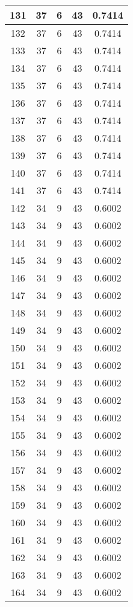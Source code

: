 \documentclass[letterpaper, 12pt]{article}
\begin{document}
\begin{longtable}{|c|c|c|c|c|}
\hline
131 & 37 & 6 & 43 & 0.7414 \\
\hline
132 & 37 & 6 & 43 & 0.7414 \\
\hline
133 & 37 & 6 & 43 & 0.7414 \\
\hline
134 & 37 & 6 & 43 & 0.7414 \\
\hline
135 & 37 & 6 & 43 & 0.7414 \\
\hline
136 & 37 & 6 & 43 & 0.7414 \\
\hline
137 & 37 & 6 & 43 & 0.7414 \\
\hline
138 & 37 & 6 & 43 & 0.7414 \\
\hline
139 & 37 & 6 & 43 & 0.7414 \\
\hline
140 & 37 & 6 & 43 & 0.7414 \\
\hline
141 & 37 & 6 & 43 & 0.7414 \\
\hline
142 & 34 & 9 & 43 & 0.6002 \\
\hline
143 & 34 & 9 & 43 & 0.6002 \\
\hline
144 & 34 & 9 & 43 & 0.6002 \\
\hline
145 & 34 & 9 & 43 & 0.6002 \\
\hline
146 & 34 & 9 & 43 & 0.6002 \\
\hline
147 & 34 & 9 & 43 & 0.6002 \\
\hline
148 & 34 & 9 & 43 & 0.6002 \\
\hline
149 & 34 & 9 & 43 & 0.6002 \\
\hline
150 & 34 & 9 & 43 & 0.6002 \\
\hline
151 & 34 & 9 & 43 & 0.6002 \\
\hline
152 & 34 & 9 & 43 & 0.6002 \\
\hline
153 & 34 & 9 & 43 & 0.6002 \\
\hline
154 & 34 & 9 & 43 & 0.6002 \\
\hline
155 & 34 & 9 & 43 & 0.6002 \\
\hline
156 & 34 & 9 & 43 & 0.6002 \\
\hline
157 & 34 & 9 & 43 & 0.6002 \\
\hline
158 & 34 & 9 & 43 & 0.6002 \\
\hline
159 & 34 & 9 & 43 & 0.6002 \\
\hline
160 & 34 & 9 & 43 & 0.6002 \\
\hline
161 & 34 & 9 & 43 & 0.6002 \\
\hline
162 & 34 & 9 & 43 & 0.6002 \\
\hline
163 & 34 & 9 & 43 & 0.6002 \\
\hline
164 & 34 & 9 & 43 & 0.6002 \\

\end{longtable}
\end{document}
